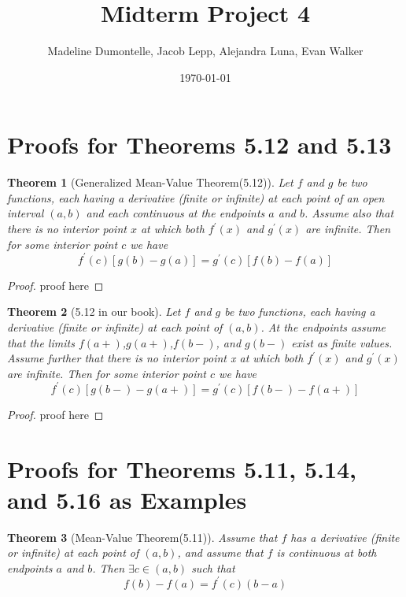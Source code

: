 \documentclass[aps,pra,notitlepage,amsmath,amssymb,letterpaper,12pt]{revtex4-1}
\newtheorem{theorem}{Theorem}
\begin{document}
\title{Midterm Project 4}
\author{Madeline Dumontelle, Jacob Lepp, Alejandra Luna, Evan Walker}
\date{\today}

\maketitle

\section{Proofs for Theorems 5.12 and 5.13}


\begin{theorem}[Generalized Mean-Value Theorem(5.12)]
Let $f$ and $g$ be two functions, each having a derivative (finite or infinite) at each point
of an open interval $(a,b)$ and each continuous at the endpoints $a$ and $b$. Assume also that there
is no interior point $x$ at which both $f^\prime(x)$ and $g^\prime(x)$ are infinite. Then for some
interior point $c$ we have
\[f^\prime(c)[g(b)-g(a)] = g^\prime(c)[f(b)-f(a)]\]
\end{theorem}

\begin{proof}
proof here
\end{proof}

\begin{theorem}[5.12 in our book]
Let $f$ and $g$ be two functions, each having a derivative (finite or infinite) at each point of $(a,b)$. At the endpoints assume that the limits $f(a+)$,$g(a+)$,$f(b-)$, and $g(b-)$ exist as finite values. Assume further that there is no interior point x at which both $f^\prime(x)$ and $g^\prime(x)$ are infinite. Then for some
interior point $c$ we have
\[f^\prime(c)[g(b-)-g(a+)] = g^\prime(c)[f(b-)-f(a+)]\]
\end{theorem}

\begin{proof}
proof here
\end{proof}

\section{Proofs for Theorems 5.11, 5.14, and 5.16 as Examples}

\begin{theorem}[Mean-Value Theorem(5.11)]
Assume that $f$ has a derivative (finite or infinite) at each point of $(a,b)$, and assume that $f$ is continuous at both endpoints $a$ and $b$. Then $\exists c \in (a,b)$ such that
\[f(b) - f(a) = f^\prime(c)(b-a)\]
\end{theorem}
\end{document}
